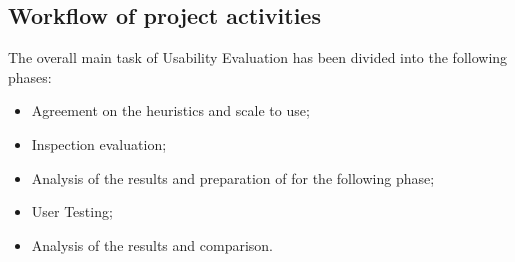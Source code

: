 \subsection{Workflow of project activities}
The overall main task of Usability Evaluation has been divided into the following phases:

\begin{itemize}
	\item Agreement on the heuristics and scale to use;
	\item Inspection evaluation;
	\item Analysis of the results and preparation of for the following phase;
	\item User Testing;
	\item Analysis of the results and comparison.
\end{itemize}

